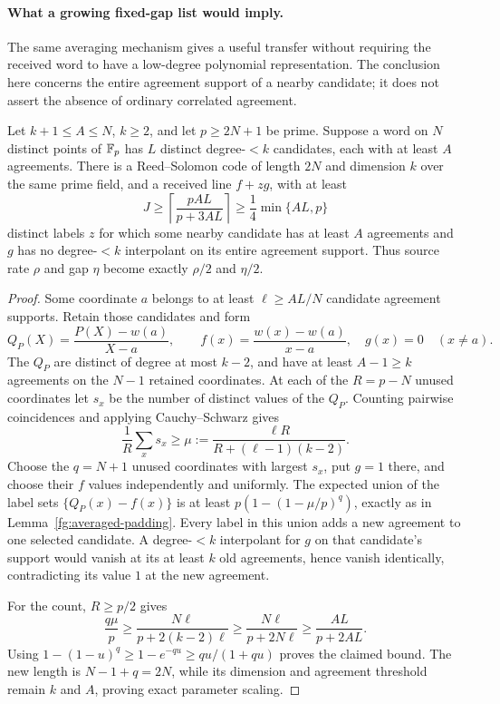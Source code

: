\paragraph{What a growing fixed-gap list would imply.}
The same averaging mechanism gives a useful transfer without requiring
the received word to have a low-degree polynomial representation.
The conclusion here concerns the entire agreement support of a nearby
candidate; it does not assert the absence of ordinary correlated agreement.

\begin{proposition}
\label{prop:exact-list-amplification}
Let $k+1\le A\le N$, $k\ge2$, and let $p\ge2N+1$ be prime.
Suppose a word on $N$ distinct points of $\mathbb F_p$ has $L$ distinct
degree-$<k$ candidates, each with at least $A$ agreements.
There is a Reed--Solomon code of length $2N$ and dimension $k$ over
the same prime field, and a received line $f+zg$, with at least
\[
 J\ge \left\lceil\frac{pAL}{p+3AL}\right\rceil
       \ge \frac14\min\{AL,p\}
\]
distinct labels $z$ for which some nearby candidate has at least $A$
agreements and $g$ has no degree-$<k$ interpolant on its entire
agreement support. Thus source rate $\rho$ and gap $\eta$ become
exactly $\rho/2$ and $\eta/2$.
\end{proposition}
\begin{proof}
Some coordinate $a$ belongs to at least $\ell\ge AL/N$ candidate
agreement supports. Retain those candidates and form
\[
 Q_P(X)=\frac{P(X)-w(a)}{X-a},\qquad
 f(x)=\frac{w(x)-w(a)}{x-a},\quad g(x)=0\quad(x\ne a).
\]
The $Q_P$ are distinct of degree at most $k-2$, and have at least
$A-1\ge k$ agreements on the $N-1$ retained coordinates.
At each of the $R=p-N$ unused coordinates let $s_x$ be the number
of distinct values of the $Q_P$. Counting pairwise coincidences and
applying Cauchy--Schwarz gives
\[
 \frac1R\sum_xs_x\ge
 \mu:=\frac{\ell R}{R+(\ell-1)(k-2)}.
\]
Choose the $q=N+1$ unused coordinates with largest $s_x$, put $g=1$
there, and choose their $f$ values independently and uniformly.
The expected union of the label sets $\{Q_P(x)-f(x)\}$ is at least
$p(1-(1-\mu/p)^q)$, exactly as in Lemma~\ref{fg:averaged-padding}.
Every label in this union adds a new agreement to one selected candidate.
A degree-$<k$ interpolant for $g$ on that candidate's support would
vanish at its at least $k$ old agreements, hence vanish identically,
contradicting its value $1$ at the new agreement.

For the count, $R\ge p/2$ gives
\[
 \frac{q\mu}{p}\ge
 \frac{N\ell}{p+2(k-2)\ell}
 \ge\frac{N\ell}{p+2N\ell}
 \ge\frac{AL}{p+2AL}.
\]
Using $1-(1-u)^q\ge1-e^{-qu}\ge qu/(1+qu)$ proves the claimed
bound. The new length is $N-1+q=2N$, while its dimension and agreement
threshold remain $k$ and $A$, proving exact parameter scaling.
\end{proof}


